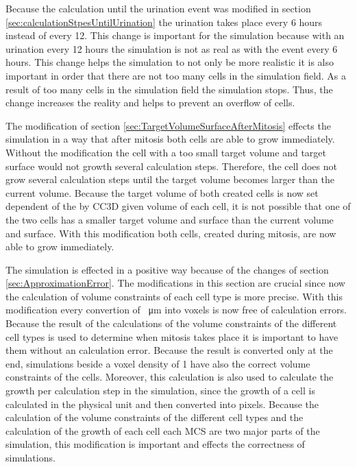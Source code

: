 Because the calculation until the urination event was modified in section \ref{sec:calculationStpesUntilUrination} the urination takes place every 6 hours instead of every 12. This change is important for the simulation because with an urination every 12 hours the simulation is not as real as with the event every 6 hours. This change helps the simulation to not only be more realistic it is also important in order that there are not too many cells in the simulation field. As a result of too many cells in the simulation field the simulation stops. Thus, the change increases the reality and helps to prevent an overflow of cells.

The modification of section \ref{sec:TargetVolumeSurfaceAfterMitosis} effects the simulation in a way that after mitosis both cells are able to grow immediately. Without the modification the cell with a too small target volume and target surface would not growth several calculation steps. Therefore, the cell does not grow several calculation steps until the target volume becomes larger than the current volume. Because the target volume of both created cells is now set dependent of the by \ac{CC3D} given volume of each cell, it is not possible that one of the two cells has a smaller target volume and surface than the current volume and surface. With this modification both cells, created during mitosis, are now able to grow immediately.

The simulation is effected in a positive way because of the changes of section \ref{sec:ApproximationError}. The modifications in this section are crucial since now the calculation of volume constraints of each cell type is more precise. With this modification every convertion of \SI{}{\micro\metre} into voxels is now free of calculation errors. Because the result of the calculations of the volume constraints of the different cell types is used to determine when mitosis takes place it is important to have them without an calculation error. Because the result is converted only at the end, simulations beside a voxel density of 1 have also the correct volume constraints of the cells. Moreover, this calculation is also used to calculate the growth per calculation step in the simulation, since the growth of a cell is calculated in the physical unit and then converted into pixels. Because the calculation of the volume constraints of the different cell types and the calculation of the growth of each cell each \ac{MCS} are two major parts of the simulation, this modification is important and effects the correctness of simulations.

